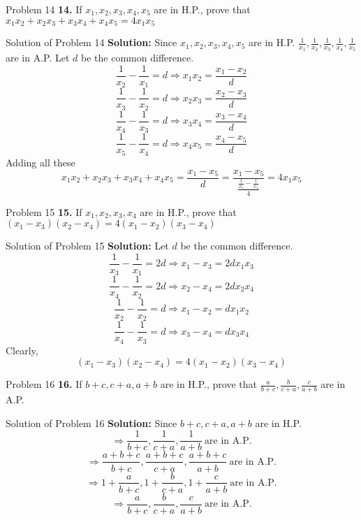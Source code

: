 \documentclass[aspectratio=1610,8pt]{beamer}
\begin{document}
\begin{frame}{Problem 14}
  \textbf{14.} If $x_1, x_2, x_3, x_4, x_5$ are in H.P., prove that $x_1x_2 +
  x_2x_3 + x_3x_4 + x_4x_5 = 4x_1x_5$
\end{frame}
\begin{frame}{Solution of Problem 14}
  \textbf{Solution:} Since $x_1, x_2, x_3, x_4, x_5$ are in
  H.P. $\frac{1}{x_1}, \frac{1}{x_2}, \frac{1}{x_3}, \frac{1}{x_4},
  \frac{1}{x_5}$ are in A.P. Let $d$ be the common difference.
  $$\frac{1}{x_2} - \frac{1}{x_1} = d \Rightarrow x_1x_2 = \frac{x_1 -
    x_2}{d}$$
  $$\frac{1}{x_3} - \frac{1}{x_2} = d \Rightarrow x_2x_3 = \frac{x_2 -
    x_3}{d}$$
  $$\frac{1}{x_4} - \frac{1}{x_3} = d \Rightarrow x_3x_4 = \frac{x_3 -
    x_4}{d}$$
  $$\frac{1}{x_5} - \frac{1}{x_4} = d \Rightarrow x_4x_5 = \frac{x_4 -
    x_5}{d}$$
  Adding all these
  $$x_1x_2 + x_2x_3 + x_3x_4 + x_4x_5 = \frac{x_1 - x_5}{d} = \frac{x_1 -
    x_5}{\frac{\frac{1}{x_5} - \frac{1}{x_1}}{4}} = 4x_1x_5$$
\end{frame}
\begin{frame}{Problem 15}
  \textbf{15.} If $x_1, x_2, x_3, x_4$ are in H.P., prove that $(x_1 - x_3)(x_2
  - x_4) = 4(x_1 - x_2)(x_3 - x_4)$
\end{frame}
\begin{frame}{Solution of Problem 15}
  \textbf{Solution:} Let $d$ be the common difference.
  $$\frac{1}{x_3} - \frac{1}{x_1} = 2d \Rightarrow x_1 - x_3 = 2dx_1x_3$$
  $$\frac{1}{x_4} - \frac{1}{x_2} = 2d \Rightarrow x_2 - x_4 = 2dx_2x_4$$
  $$\frac{1}{x_2} - \frac{1}{x_2} = d \Rightarrow x_1 - x_2 = dx_1x_2$$
  $$\frac{1}{x_4} - \frac{1}{x_3} = d \Rightarrow x_3 - x_4 = dx_3x_4$$
  Clearly,
  $$(x_1 - x_3)(x_2 - x_4) = 4(x_1 - x_2)(x_3 - x_4)$$
\end{frame}
\begin{frame}{Problem 16}
  \textbf{16.} If $b + c, c + a, a + b$ are in H.P., prove that $\frac{a}{b +
    c}, \frac{b}{c + a}, \frac{c}{a + b}$ are in A.P.
\end{frame}
\begin{frame}{Solution of Problem 16}
  \textbf{Solution:} Since $b + c, c + a, a + b$ are in H.P.
  $$\Rightarrow \frac{1}{b + c}, \frac{1}{c + a}, \frac{1}{a + b}~\text{are in
    A.P.}$$
  $$\Rightarrow \frac{a + b + c}{b + c}, \frac{a + b + c}{c + a}, \frac{a + b +
    c}{a + b}~\text{are in A.P.}$$
  $$\Rightarrow 1 + \frac{a}{b + c}, 1 + \frac{b}{c + a}, 1+ \frac{c}{a +
    b}~\text{are in A.P.}$$
  $$\Rightarrow \frac{a}{b + c}, \frac{b}{c + a}, \frac{c}{a + b}~\text{are in
    A.P.}$$
\end{frame}
\end{document}
